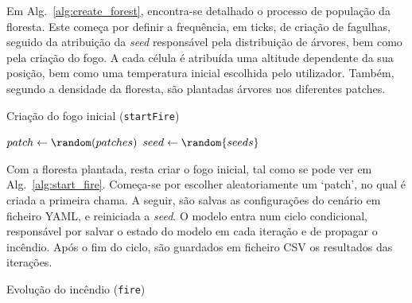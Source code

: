 Em Alg.~\ref{alg:create_forest}, encontra-se detalhado o processo de população da floresta.
Este começa por definir a frequência, em ticks, de criação de fagulhas, seguido da atribuição da \textit{seed} responsável pela distribuição de árvores, bem como pela criação do fogo.
A cada célula é atribuída uma altitude dependente da sua posição, bem como uma temperatura inicial escolhida pelo utilizador.
Também, segundo a densidade da floresta, são plantadas árvores nos diferentes patches.


\begin{algorithm}
    \caption{Criação do fogo inicial (\texttt{startFire})}\label{alg:start_fire}
    $patch \gets \random(patches)$\;
    \;
    \saveConfig{}\;
    $seed \gets \random{seeds}$\;
    \While{\anyTreesBurning{}}{
        \saveIteration{}\;
        \fire{}\;
    }
    \saveIterations{}\;
\end{algorithm}

Com a floresta plantada, resta criar o fogo inicial, tal como se pode ver em Alg.~\ref{alg:start_fire}.
Começa-se por escolher aleatoriamente um ‘patch’, no qual é criada a primeira chama.
A seguir, são salvas as configurações do cenário em ficheiro YAML, e reiniciada a \textit{seed}.
O modelo entra num ciclo condicional, responsável por salvar o estado do modelo em cada iteração e de propagar o incêndio.
Após o fim do ciclo, são guardados em ficheiro CSV os resultados das iterações.


\begin{algorithm}
    \caption{Evolução do incêndio (\texttt{fire})}\label{alg:fire}
\fadeEmbers{}\;
\tick{}\;
\end{algorithm}

